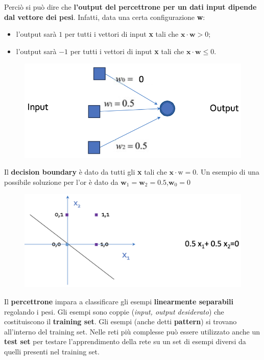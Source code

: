 Perciò si può dire che \textbf{l'output del percettrone per un dati input dipende dal vettore dei pesi}. Infatti, data una certa configurazione \textbf{w}:
\begin{itemize}
    \item l'output sarà $1$ per tutti i vettori di input \textbf{x} tali che $\textbf{x}\cdot\textbf{w}>0$;
    \item l'output sarà $-1$ per tutti i vettori di input \textbf{x} tali che $\textbf{x}\cdot\textbf{w}\leq0$.
\end{itemize}
\begin{figure}[!h]
    \includegraphics[scale=.8]{images/perceptron/weight.png}
    \centering
\end{figure}


Il \textbf{decision boundary} è dato da tutti gli \textbf{x} tali che $\textbf{x}\cdot\text{w}=0$.
\newline
\newline
Un esempio di una possibile soluzione per l'or è dato da $\textbf{w}_1=\textbf{w}_2=0.5$,$\textbf{w}_0=0$
\begin{figure}[!h]
    \includegraphics[scale=.5]{images/perceptron/orSolution.png}
    \centering
\end{figure}
\newpage
Il \textbf{percettrone} impara a classificare gli esempi \textbf{linearmente separabili} regolando i pesi. Gli esempi sono coppie (\textit{input, output desiderato}) che costituiscono il \textbf{training set}. Gli esempi (anche detti \textbf{pattern}) si trovano all'interno del training set. Nelle reti più complesse può essere utilizzato anche un \textbf{test set} per testare l'apprendimento della rete su un set di esempi diversi da quelli presenti nel training set.
